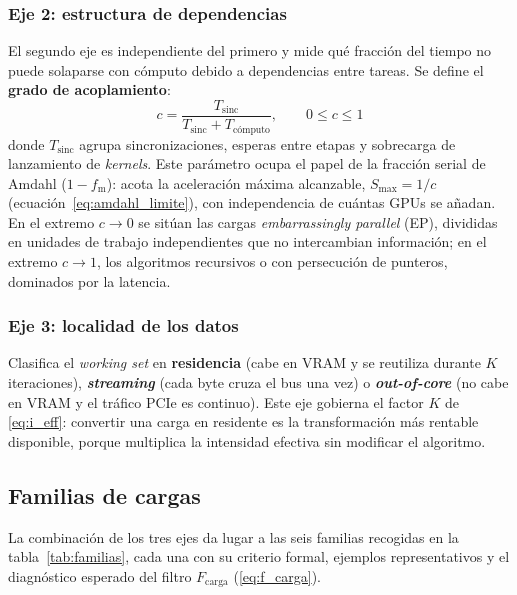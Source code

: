 \documentclass[a4paper,11pt]{article}
\begin{document}
\subsubsection*{Eje 2: estructura de dependencias}

El segundo eje es independiente del primero y mide qué fracción del tiempo no puede solaparse con cómputo debido a
dependencias entre tareas. Se define el \textbf{grado de acoplamiento}:
\begin{equation}\label{eq:acoplamiento}
    c = \frac{T_{\text{sinc}}}{T_{\text{sinc}} + T_{\text{cómputo}}}, \qquad 0 \le c \le 1
\end{equation}
donde $T_{\text{sinc}}$ agrupa sincronizaciones, esperas entre etapas y sobrecarga de lanzamiento de \textit{kernels}. Este
parámetro ocupa el papel de la fracción serial de Amdahl ($1 - f_{\text{m}}$): acota la aceleración máxima alcanzable,
$S_{\max} = 1/c$ (ecuación~\eqref{eq:amdahl_limite}), con independencia de cuántas GPUs se añadan. En el extremo $c \to 0$
se sitúan las cargas \textit{embarrassingly parallel} (EP), divididas en unidades de trabajo independientes que no
intercambian información; en el extremo $c \to 1$, los algoritmos recursivos o con persecución de punteros, dominados por
la latencia.

\subsubsection*{Eje 3: localidad de los datos}

Clasifica el \textit{working set} en \textbf{residencia} (cabe en VRAM y se reutiliza durante $K$ iteraciones),
\textbf{\textit{streaming}} (cada byte cruza el bus una vez) o \textbf{\textit{out-of-core}} (no cabe en VRAM y el tráfico
PCIe es continuo). Este eje gobierna el factor $K$ de \eqref{eq:i_eff}: convertir una carga en residente es la
transformación más rentable disponible, porque multiplica la intensidad efectiva sin modificar el algoritmo.

\subsection{Familias de cargas}

La combinación de los tres ejes da lugar a las seis familias recogidas en la tabla~\ref{tab:familias}, cada una con su
criterio formal, ejemplos representativos y el diagnóstico esperado del filtro $F_{\text{carga}}$ (\eqref{eq:f_carga}).
\end{document}
